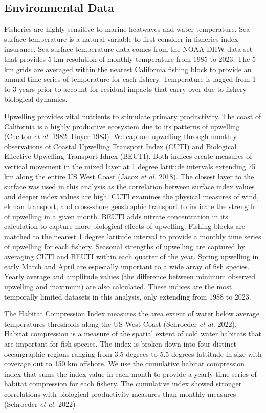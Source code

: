 \documentclass[
  letterpaper,
  DIV=11,
  numbers=noendperiod]{scrartcl}
\begin{document}
\hypertarget{environmental-data}{%
\subsection{Environmental Data}\label{environmental-data}}

Fisheries are highly sensitive to marine heatwaves and water
temperature. Sea surface temperature is a natural variable to first
consider in fisheries index insurance. Sea surface temperature data
comes from the NOAA DHW data set that provides 5-km resolution of
monthly temperature from 1985 to 2023. The 5-km grids are averaged
within the nearest California fishing block to provide an annual time
series of temperature for each fishery. Temperature is lagged from 1 to
3 years prior to account for residual impacts that carry over due to
fishery biological dynamics.

Upwelling provides vital nutrients to stimulate primary productivity.
The coast of California is a highly productive ecosystem due to its
patterns of upwelling (Chelton \emph{et al.} 1982; Huyer 1983). We
capture upwelling through monthly observations of Coastal Upwelling
Transport Index (CUTI) and Biological Effective Upwelling Transport
Idnex (BEUTI). Both indices create measures of vertical movement in the
mixed layer at 1 degree latitude intervals extending 75 km along the
entire US West Coast (Jacox \emph{et al.} 2018). The closest layer to
the surface was used in this analysis as the correlation between surface
index values and deeper index values are high. CUTI examines the
physical measures of wind, ekman transport, and cross-shore geostrophic
transport to indicate the strength of upwelling in a given month. BEUTI
adds nitrate concentration in its calculation to capture more biological
effects of upwelling. Fishing blocks are matched to the nearest 1 degree
latitude interval to provide a monthly time series of upwelling for each
fishery. Seasonal strengths of upwelling are captured by averaging CUTI
and BEUTI within each quarter of the year. Spring upwelling in early
March and April are especially important to a wide array of fish
species. Yearly average and amplitude values (the difference between
minimum observed upwelling and maximum) are also calculated. These
indices are the most temporally limited datasets in this analysis, only
extending from 1988 to 2023.

The Habitat Compression Index measures the area extent of water below
average temperatures thresholds along the US West Coast (Schroeder
\emph{et al.} 2022). Habitat compression is a measure of the spatial
extent of cold water habitats that are important for fish species. The
index is broken down into four distinct oceangraphic regions ranging
from 3.5 degrees to 5.5 degrees lattitude in size with coverage out to
150 km offshore. We use the cumulative habitat compression index that
sums the index value in each month to provide a yearly time series of
habitat compression for each fishery. The cumulative index showed
stronger correlations with biological productivity measures than monthly
measures (Schroeder \emph{et al.} 2022)
\end{document}
